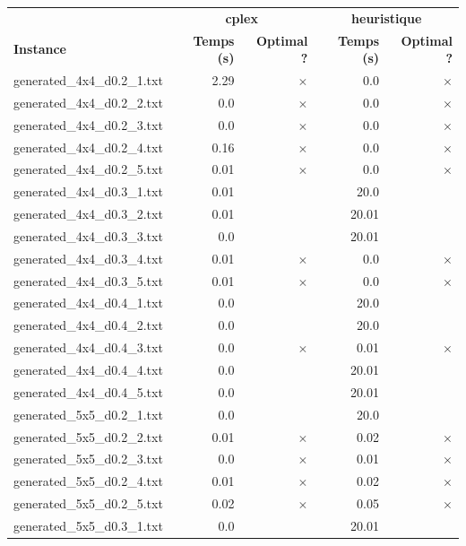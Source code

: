 \documentclass{article}
\begin{document}
\begin{center}
\renewcommand{\arraystretch}{1.4} 
 \begin{tabular}{lrrrr}
	\hline
 & \multicolumn{2}{c}{\textbf{cplex}} & \multicolumn{2}{c}{\textbf{heuristique}}\\
\textbf{Instance}  & \textbf{Temps (s)} & \textbf{Optimal ?}  & \textbf{Temps (s)} & \textbf{Optimal ?} \\\hline

generated\_4x4\_d0.2\_1.txt & 2.29 & 
$\times$
 & 0.0 & 
$\times$
\\
generated\_4x4\_d0.2\_2.txt & 0.0 & 
$\times$
 & 0.0 & 
$\times$
\\
generated\_4x4\_d0.2\_3.txt & 0.0 & 
$\times$
 & 0.0 & 
$\times$
\\
generated\_4x4\_d0.2\_4.txt & 0.16 & 
$\times$
 & 0.0 & 
$\times$
\\
generated\_4x4\_d0.2\_5.txt & 0.01 & 
$\times$
 & 0.0 & 
$\times$
\\
generated\_4x4\_d0.3\_1.txt & 0.01 & 
 & 20.0 & 
\\
generated\_4x4\_d0.3\_2.txt & 0.01 & 
 & 20.01 & 
\\
generated\_4x4\_d0.3\_3.txt & 0.0 & 
 & 20.01 & 
\\
generated\_4x4\_d0.3\_4.txt & 0.01 & 
$\times$
 & 0.0 & 
$\times$
\\
generated\_4x4\_d0.3\_5.txt & 0.01 & 
$\times$
 & 0.0 & 
$\times$
\\
generated\_4x4\_d0.4\_1.txt & 0.0 & 
 & 20.0 & 
\\
generated\_4x4\_d0.4\_2.txt & 0.0 & 
 & 20.0 & 
\\
generated\_4x4\_d0.4\_3.txt & 0.0 & 
$\times$
 & 0.01 & 
$\times$
\\
generated\_4x4\_d0.4\_4.txt & 0.0 & 
 & 20.01 & 
\\
generated\_4x4\_d0.4\_5.txt & 0.0 & 
 & 20.01 & 
\\
generated\_5x5\_d0.2\_1.txt & 0.0 & 
 & 20.0 & 
\\
generated\_5x5\_d0.2\_2.txt & 0.01 & 
$\times$
 & 0.02 & 
$\times$
\\
generated\_5x5\_d0.2\_3.txt & 0.0 & 
$\times$
 & 0.01 & 
$\times$
\\
generated\_5x5\_d0.2\_4.txt & 0.01 & 
$\times$
 & 0.02 & 
$\times$
\\
generated\_5x5\_d0.2\_5.txt & 0.02 & 
$\times$
 & 0.05 & 
$\times$
\\
generated\_5x5\_d0.3\_1.txt & 0.0 & 
 & 20.01 & 
\\

\end{tabular}
\end{center}
\end{document}
